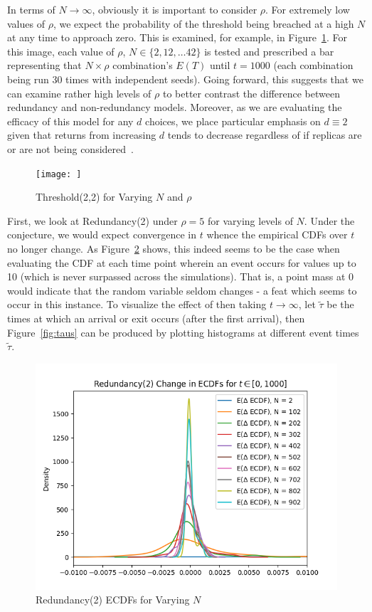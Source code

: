 In terms of $N \rightarrow \infty$, obviously it is important to consider $\rho$. For extremely low values of $\rho$, we expect the probability of the threshold being breached at a high $N$ at any time to approach zero. This is examined, for example, in Figure~\ref{fig:img1}. For this image, each value of $\rho$, $N \in \{2, 12, \dots 42\}$ is tested and prescribed a bar representing that $N \times \rho$ combination's $E(T)$ until $t=1000$ (each combination being run 30 times with independent seeds). Going forward, this suggests that we can examine rather high levels of $\rho$ to better contrast the difference between redundancy and non-redundancy models. Moreover, as we are evaluating the efficacy of this model for any $d$ choices, we place particular emphasis on $d \equiv 2$ given that returns from increasing $d$ tends to decrease regardless of if replicas are or are not being considered~\cite{gardner_redundancy-d_2017,power}.
\begin{figure}
    \centering
    \texttt{[image: ]} %
    \caption{Threshold(2,2) for Varying $N$ and $\rho$}
    \label{fig:img1}
\end{figure}


First, we look at Redundancy(2) under $\rho = 5$ for varying levels of $N$. Under the conjecture, we would expect convergence in $t$ whence the empirical CDFs over $t$ no longer change. As Figure~\ref{fig:redecdf} shows, this indeed seems to be the case when evaluating the CDF at each time point wherein an event occurs for values up to 10 (which is never surpassed across the simulations). That is, a point mass at $0$ would indicate that the random variable seldom changes - a feat which seems to occur in this instance. To visualize the effect of then taking $t \rightarrow \infty$, let $\tilde{\tau}$ be the times at which an arrival or exit occurs (after the first arrival), then Figure~\ref{fig:taus} can be produced by plotting histograms at different event times $\tilde{\tau}$.

\begin{figure}
    \centering
    \includegraphics[width=0.7\linewidth]{redundancyecdf}
    \caption{Redundancy(2) ECDFs for Varying $N$}
    \label{fig:redecdf}
\end{figure}

